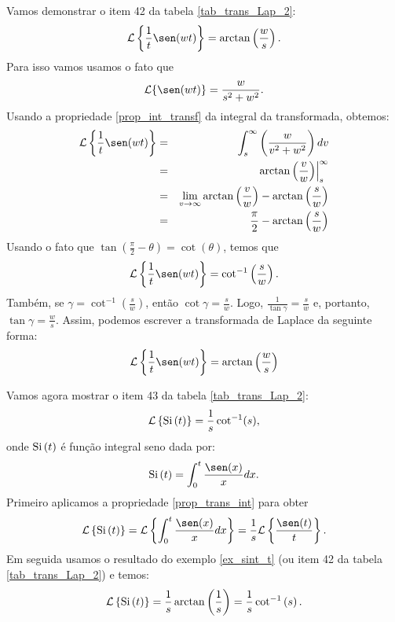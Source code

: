 \begin{ex}{\label{ex_sint_t}}Vamos demonstrar o item 42 da tabela \ref{tab_trans_Lap_2}:
\begin{equation}
\mathcal{L}\left\{\frac{1}{t}\sen(wt)\right\}=\arctan\left(\frac{w}{s}\right).
\end{equation}
Para isso vamos usamos o fato que
\begin{equation*}
\mathcal{L}\{\sen(wt)\}=\frac{w}{s^2+w^2}.
\end{equation*}
Usando a propriedade \ref{prop_int_transf} da integral da transformada, obtemos:
\begin{eqnarray*}
\mathcal{L}\left\{\frac{1}{t}\sen(wt)\right\}&=&\int_s^\infty \left(\frac{w}{v^2+w^2}\right)dv\\
&=& \left.\arctan\left(\frac{v}{w}\right)\right|_s^\infty\\
&=&\lim_{v\to\infty}\arctan\left(\frac{v}{w}\right)-\arctan\left(\frac{s}{w}\right)\\
&=&\frac{\pi}{2}-\arctan\left(\frac{s}{w}\right)\\
\end{eqnarray*}
Usando o fato que $\tan\left(\frac{\pi}{2}-\theta\right)=\cot(\theta)$, temos que
\begin{eqnarray*}
\mathcal{L}\left\{\frac{1}{t}\sen(wt)\right\}=\cot^{-1}\left(\frac{s}{w}\right).
\end{eqnarray*}
Também, se $\gamma=\cot^{-1}\left(\frac{s}{w}\right)$, então $\cot\gamma=\frac{s}{w}$. Logo, $\frac{1}{\tan\gamma}=\frac{s}{w}$ e, portanto, $\tan\gamma=\frac{w}{s}$. Assim, podemos escrever a transformada de Laplace da seguinte forma:
\begin{eqnarray*}
\mathcal{L}\left\{\frac{1}{t}\sen(wt)\right\}=\arctan\left(\frac{w}{s}\right)
\end{eqnarray*}
\end{ex}
\begin{ex}Vamos agora mostrar o item 43 da tabela \ref{tab_trans_Lap_2}:
\begin{equation}
\mathcal{L}\left\{\hbox{Si}\ \!(t)\right\}=\frac{1}{s}\cot^{-1}(s),
\end{equation}
onde $\hbox{Si}\ \!(t)$ é função integral seno dada por:
\begin{equation}
\hbox{Si}\ \!(t)=\int_0^t\frac{\sen(x)}{x}dx.
\end{equation}
Primeiro aplicamos a propriedade \ref{prop_trans_int} para obter
\begin{equation}
\mathcal{L}\left\{\hbox{Si}\ \!(t)\right\}=\mathcal{L}\left\{\int_0^t\frac{\sen(x)}{x}dx\right\}=\frac{1}{s}\mathcal{L}\left\{\frac{\sen(t)}{t}\right\}.
\end{equation}
Em seguida usamos o resultado do exemplo \ref{ex_sint_t} (ou item 42 da tabela \ref{tab_trans_Lap_2}) e temos:
\begin{equation}
\mathcal{L}\left\{\hbox{Si}\ \!(t)\right\}=\frac{1}{s}\arctan\left(\frac{1}{s}\right)=\frac{1}{s}\cot^{-1}\left(s\right).
\end{equation}
\end{ex}

